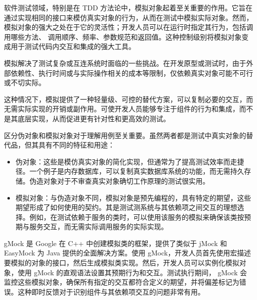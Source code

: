 软件测试领域，特别是在 TDD 方法论中，模拟对象起着至关重要的作用。它旨在通过实现相同的接口来模仿真实对象的行为，从而在测试中模拟实际对象。然而，模拟对象的强大之处在于它的灵活性；开发人员可以在运行时指定其行为，包括调用哪些方法、 调用顺序、频率、参数规范和返回值。这种控制级别将模拟对象变成用于测试代码内交互和集成的强大工具。

模拟解决了测试复杂或互连系统时面临的一些挑战。在开发原型或测试时，由于外部依赖性、执行时间或与实际操作相关的成本等限制，仅依赖真实对象可能不可行或不切实际。

这种情况下，模拟提供了一种轻量级、可控的替代方案，可以复制必要的交互，而无需实际实现的开销或副作用。可使开发人员能够专注于组件的行为和集成，而不是其底层实现，从而促进更有针对性和更高效的测试。

区分伪对象和模拟对象对于理解用例至关重要。虽然两者都是测试中真实对象的替代品，但其具有不同的特征和用途：

\begin{itemize}
\item
伪对象：这些是模仿真实对象的简化实现，但通常为了提高测试效率而走捷径。一个例子是内存数据库，可以复制真实数据库系统的功能，而无需持久存储。伪造对象对于不审查真实对象确切工作原理的测试很实用。

\item
模拟对象：与伪造对象不同，模拟对象是预先编程的，具有特定的期望，这些期望形成了如何使用的契约。其是测试测系统与其依赖项之间交互的理想选择。例如，在测试依赖于服务的类时，可以使用该服务的模拟来确保该类按预期与服务交互，而无需实际调用服务的实际实现。
\end{itemize}

gMock 是 Google 在 C++ 中创建模拟类的框架，提供了类似于 jMock 和 EasyMock 为 Java 提供的全面解决方案。使用 gMock，开发人员首先使用宏描述要模拟的对象的接口，然后生成模拟类实现。然后，开发人员可以实例化模拟对象，使用 gMock 的直观语法设置其预期行为和交互。测试执行期间， gMock 会监控这些模拟对象，确保所有指定的交互都符合定义的期望，并将偏差标记为错误。这种即时反馈对于识别组件与其依赖项交互的问题非常有用。












